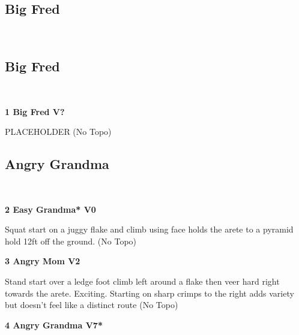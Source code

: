 \begin{multicols}{2}
		\section{Big Fred}\label{sa:Big Fred}
	\begin{minipage}{\columnwidth}
	\
	\end{minipage}

			\subsection*{Big Fred}\label{bf:Big Fred}
			\begin{minipage}{\columnwidth}
			\
			\end{minipage}
			
					\begin{minipage}{\linewidth}	
					\label{rt:Big Fred}
\colorbox{black!20}{
\textbf{
1 Big Fred V?  
}
}

					\begin{adjustwidth}{0.5cm}{}				
					PLACEHOLDER
						\newline (No Topo) 
					\end{adjustwidth}
					\end{minipage}
			\subsection*{Angry Grandma}\label{bf:Angry Grandma}
			\begin{minipage}{\columnwidth}
			\
			\end{minipage}
			
					\begin{minipage}{\linewidth}	
					\label{rt:Easy Grandma}
\colorbox{green!20}{
\textbf{
2 Easy Grandma* V0   
}
}

					\begin{adjustwidth}{0.5cm}{}				
					Squat start on a juggy flake and climb using face holds the arete to a pyramid hold 12ft off the ground.
						\newline (No Topo) 
					\end{adjustwidth}
					\end{minipage}
					\begin{minipage}{\linewidth}	
					\label{rt:Angry Mom}
\colorbox{green!20}{
\textbf{
3 Angry Mom V2  \ding{72}  \warn 
}
}

					\begin{adjustwidth}{0.5cm}{}				
					Stand start over a ledge foot climb left around a flake then veer hard right towards the arete. Exciting. Starting on sharp crimps to the right adds variety but doesn't feel like a distinct route
						\newline (No Topo) 
					\end{adjustwidth}
					\end{minipage}
					\begin{minipage}{\linewidth}	
					\label{rt:Angry Grandma}
\colorbox{Goldenrod!50}{
\textbf{
4 Angry Grandma V7*  
}
}


\end{minipage}
\end{multicols}
